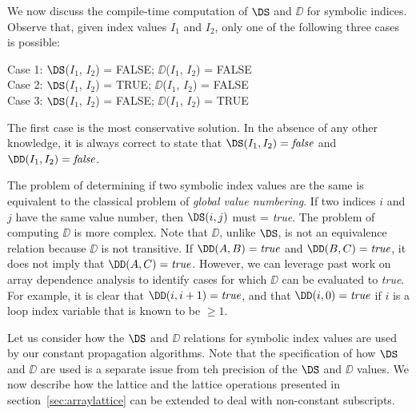 We now discuss the compile-time
computation of $\DS$ and $\DD$ for symbolic
indices. 
Observe that,
given index values $I_1$ and $I_2$, only one of the following three cases
is possible:
\begin{center}
\parbox{3.0in}{
\begin{programa}
Case 1:   $\DS$($I_1$, $I_2$) = FALSE; $\DD$($I_1$, $I_2$) = FALSE \\
Case 2:   $\DS$($I_1$, $I_2$) = TRUE; $\DD$($I_1$, $I_2$) = FALSE \\
Case 3:   $\DS$($I_1$, $I_2$) = FALSE; $\DD$($I_1$, $I_2$) = TRUE \\
\end{programa}
}
\end{center}
The first case is the most conservative solution.  In the absence of
any other knowledge, it is always correct to state that
$\DS(I_1,I_2) = \mbox{\it false}$ and $\DD(I_1,I_2) = \mbox{\it
false}$.

The problem of determining
if two symbolic index values are the same is equivalent to the
classical problem of {\it global value numbering}. If two indices $i$
and $j$ have the same value number, then $\DS(i,j)$ must = {\it true}.
The problem of computing
$\DD$ is more complex. Note that $\DD$, unlike $\DS$, is not an
equivalence relation because $\DD$ is not transitive.
If $\DD(A, B)=\mbox{\it true}$
and $\DD(B, C)=\mbox{\it true}$, it does
not imply that $\DD(A, C)=\mbox{\it true}$.  
However, we can leverage past work on array dependence analysis
to identify cases for which $\DD$ can be
evaluated to {\it true}.  For example, it is clear that $\DD(i,
i+1) = \mbox{\it true}$,
and that $\DD(i, 0) = \mbox{\it true}$ if $i$ is a loop index variable
that is known to be $\geq 1$.

Let us consider how the $\DS$ and $\DD$ relations for 
symbolic index values
are used by our constant
propagation algorithms.  Note that the specification of how $\DS$ and $\DD$
are used is a separate issue from teh precision of
the $\DS$ and $\DD$ values.
We now describe how 
the lattice and the lattice operations presented in
section~\ref{sec:arraylattice} can be extended
to deal with non-constant subscripts.

